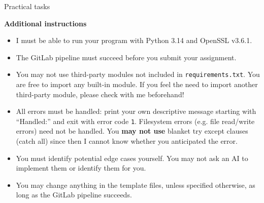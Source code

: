 \documentclass{homework}
\begin{document}
\newpage
\setcounter{task}{0}

\begin{center}
  Practical tasks
\end{center}

\textbf{Additional instructions}

\begin{itemize}
  \item I must be able to run your program with Python 3.14 and OpenSSL v3.6.1\footnotemark{}.
  \item The GitLab pipeline must succeed before you submit your assignment.
  \item You may not use third-party modules not included in \texttt{requirements.txt}.
  You are free to import any built-in module.
  If you feel the need to import another third-party module, please check with me beforehand!
  \item All errors must be handled: print your own descriptive message starting with \enquote{Handled:} and exit with error code \texttt{1}.
  Filesystem errors (e.g. file read/write errors) need not be handled.
  You \textbf{may not use} blanket try except clauses (catch all) since then I cannot know whether you anticipated the error.
  \item You must identify potential edge cases yourself.
  You may not ask an AI to implement them or identify them for you.
  \item You may change anything in the template files, unless specified otherwise, as long as the GitLab pipeline succeeds.
\end{itemize}
\end{document}
